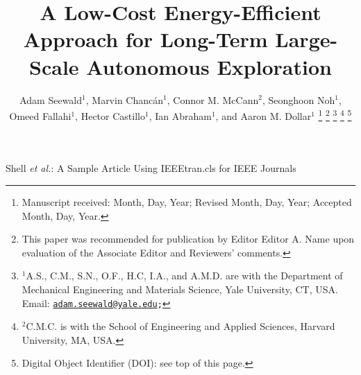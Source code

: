 \documentclass[lettersize,journal]{IEEEtran}
\theoremstyle{definition}
\begin{document}

\title{A Low-Cost Energy-Efficient Approach for Long-Term Large-Scale Autonomous Exploration}%

\author{Adam Seewald${}^\text{1}$, Marvin Chanc{\'a}n${}^\text{1}$, Connor M. McCann${}^\text{2}$, Seonghoon Noh${}^\text{1}$, Omeed Fallahi${}^\text{1}$, Hector Castillo${}^\text{1}$, Ian Abraham${}^\text{1}$, and Aaron M. Dollar${}^\text{1}$%
  \thanks{Manuscript received: Month, Day, Year; Revised Month, Day, Year; Accepted Month, Day, Year.}%
  \thanks{This paper was recommended for publication by Editor Editor A. Name upon evaluation of the Associate Editor and Reviewers' comments.} %
  \thanks{${}^\text{1}$A.\hspace*{.4ex}S., C.\hspace*{.4ex}M., S.\hspace*{.4ex}N., O.\hspace*{.4ex}F., H.\hspace*{.4ex}C, I.\hspace*{.4ex}A., and A.\hspace*{.4ex}M.\hspace*{.4ex}D. are with the Department of Mechanical Engineering and Materials Science, Yale University, CT, USA. Email: {\tt\footnotesize \href{mailto:adam.seewald@yale.edu}{adam.seewald@yale.edu};}}
  \thanks{${}^\text{2}$C.\hspace*{.4ex}M.\hspace*{.4ex}C. is with the School of Engineering and Applied Sciences, Harvard University, MA, USA.}
  \thanks{Digital Object Identifier (DOI): see top of this page.}
}

%
{Shell \MakeLowercase{\textit{et al.}}: A Sample Article Using IEEEtran.cls for IEEE Journals}

\end{document}
